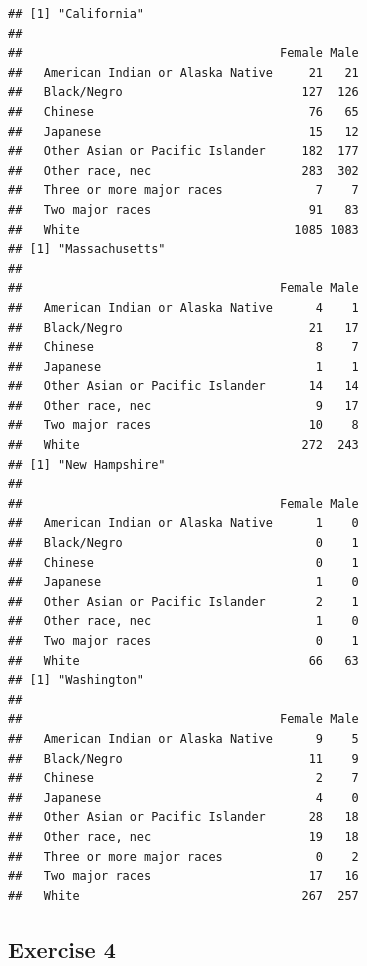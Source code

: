 \documentclass[]{book}
\newenvironment{Shaded}{\begin{snugshade}}{\end{snugshade}}
\theoremstyle{definition}
\theoremstyle{definition}
\theoremstyle{definition}
\theoremstyle{remark}
\begin{document}
\begin{Shaded}
\begin{Highlighting}[]
\begin{Shaded}
\begin{Highlighting}[]
\begin{Shaded}
\begin{Highlighting}[]
\begin{verbatim}
## [1] "California"
##                                   
##                                    Female Male
##   American Indian or Alaska Native     21   21
##   Black/Negro                         127  126
##   Chinese                              76   65
##   Japanese                             15   12
##   Other Asian or Pacific Islander     182  177
##   Other race, nec                     283  302
##   Three or more major races             7    7
##   Two major races                      91   83
##   White                              1085 1083
## [1] "Massachusetts"
##                                   
##                                    Female Male
##   American Indian or Alaska Native      4    1
##   Black/Negro                          21   17
##   Chinese                               8    7
##   Japanese                              1    1
##   Other Asian or Pacific Islander      14   14
##   Other race, nec                       9   17
##   Two major races                      10    8
##   White                               272  243
## [1] "New Hampshire"
##                                   
##                                    Female Male
##   American Indian or Alaska Native      1    0
##   Black/Negro                           0    1
##   Chinese                               0    1
##   Japanese                              1    0
##   Other Asian or Pacific Islander       2    1
##   Other race, nec                       1    0
##   Two major races                       0    1
##   White                                66   63
## [1] "Washington"
##                                   
##                                    Female Male
##   American Indian or Alaska Native      9    5
##   Black/Negro                          11    9
##   Chinese                               2    7
##   Japanese                              4    0
##   Other Asian or Pacific Islander      28   18
##   Other race, nec                      19   18
##   Three or more major races             0    2
##   Two major races                      17   16
##   White                               267  257
\end{verbatim}

\hypertarget{exercise-4}{%
\subsection*{Exercise 4}\label{exercise-4}}


\end{Highlighting}
\end{Shaded}
\end{Highlighting}
\end{Shaded}
\end{Highlighting}
\end{Shaded}
\end{document}
